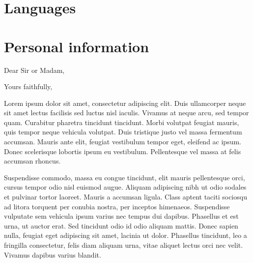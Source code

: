 \documentclass[11pt,a4paper,sans]{moderncv}        %
\begin{document}
\section{Languages}

\section{Personal information}


\clearpage
\date{January 01, 1984}
\opening{Dear Sir or Madam,}
\closing{Yours faithfully,}
\makelettertitle

Lorem ipsum dolor sit amet, consectetur adipiscing elit. Duis ullamcorper neque sit amet lectus facilisis sed luctus nisl iaculis. Vivamus at neque arcu, sed tempor quam. Curabitur pharetra tincidunt tincidunt. Morbi volutpat feugiat mauris, quis tempor neque vehicula volutpat. Duis tristique justo vel massa fermentum accumsan. Mauris ante elit, feugiat vestibulum tempor eget, eleifend ac ipsum. Donec scelerisque lobortis ipsum eu vestibulum. Pellentesque vel massa at felis accumsan rhoncus.

Suspendisse commodo, massa eu congue tincidunt, elit mauris pellentesque orci, cursus tempor odio nisl euismod augue. Aliquam adipiscing nibh ut odio sodales et pulvinar tortor laoreet. Mauris a accumsan ligula. Class aptent taciti sociosqu ad litora torquent per conubia nostra, per inceptos himenaeos. Suspendisse vulputate sem vehicula ipsum varius nec tempus dui dapibus. Phasellus et est urna, ut auctor erat. Sed tincidunt odio id odio aliquam mattis. Donec sapien nulla, feugiat eget adipiscing sit amet, lacinia ut dolor. Phasellus tincidunt, leo a fringilla consectetur, felis diam aliquam urna, vitae aliquet lectus orci nec velit. Vivamus dapibus varius blandit.
\end{document}
